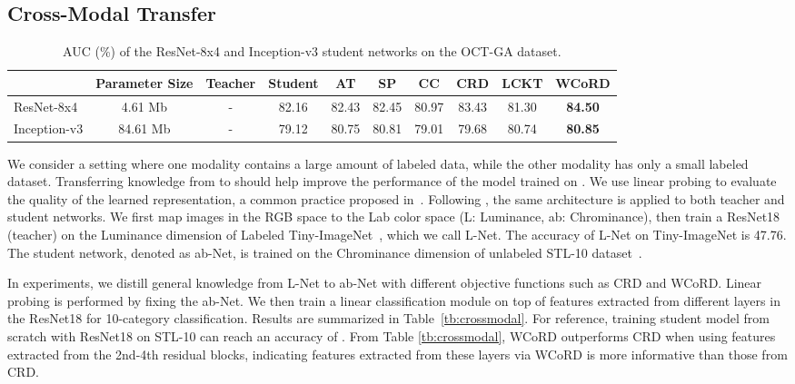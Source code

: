 \documentclass[final]{cvpr}
\theoremstyle{definition}
\begin{document}
\subsection{Cross-Modal Transfer}


\begin{table*}[t!]
\small
\begin{center}
\begin{tabular}{l|c|cc|cccc|cc}
\toprule
 & Parameter Size  & Teacher & Student & AT & SP & CC & CRD & LCKT & WCoRD \\
\midrule
ResNet-8x4 & 4.61 Mb  & - & 82.16 & 82.43 &  82.45 & 80.97 & 83.43 & 81.30 & \textbf{84.50}\\
\hline 
Inception-v3 & 84.61 Mb & - & 79.12 & 80.75 &  80.81 & 79.01 & 79.68 & 80.74 & \textbf{80.85}\\
\bottomrule
\end{tabular}
\caption{
\small{AUC (\%) of the ResNet-8x4 and Inception-v3 student networks on the OCT-GA dataset.}
}
\label{tb:privilege}
\end{center}
\vspace{-5mm}
\end{table*}
 We consider a setting where one modality  contains a large amount of labeled data, while the other modality  has only a small labeled dataset. Transferring knowledge from  to  should help improve the performance of the model trained on .
We use linear probing to evaluate the quality of the learned representation, a common practice proposed in~\cite{alain2016understanding, zhang2017split}. 
Following \cite{tian2019contrastive}, the same architecture is applied to both teacher and student networks. We first map images in the RGB space to the Lab color space (L: Luminance, ab: Chrominance), then train a ResNet18 (teacher) on the Luminance dimension of Labeled Tiny-ImageNet~\cite{deng2009imagenet}, which we call L-Net. The accuracy of L-Net on Tiny-ImageNet is 47.76. The student network, denoted as ab-Net, is trained on the Chrominance dimension of unlabeled STL-10 dataset~\cite{coates2011analysis}.

In experiments, we distill general knowledge from L-Net to ab-Net with different objective functions such as CRD and WCoRD.
Linear probing is performed by fixing the ab-Net. We then train a linear classification module on top of features extracted from different layers in the ResNet18 for 10-category classification. 
Results are summarized in Table~\ref{tb:crossmodal}. For reference, training student model from scratch with ResNet18 on STL-10 can reach an accuracy of . 
From Table \ref{tb:crossmodal}, WCoRD outperforms CRD when using features extracted from the 2nd-4th residual blocks, indicating features extracted from these layers via WCoRD is more informative than those from CRD.
\end{document}
